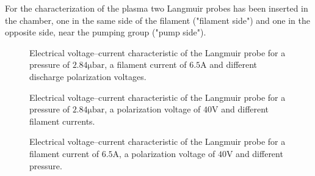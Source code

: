 \documentclass[11pt,a4 paper]{article}
\begin{document}
For the characterization of the plasma two Langmuir probes has been inserted in the chamber, one in the same side of the filament ("filament side") and one in the opposite side, near the pumping group ("pump side").
%
\begin{figure}[H]
\vspace{-0.3cm}%
 \vspace{-0.3cm}\caption{Electrical voltage--current characteristic of the Langmuir probe for a pressure of $2.84\si{\micro\bar}$, a filament current of $6.5\si{\ampere}$ and different discharge polarization voltages.}\label{fig:Lang}%
\end{figure}%
\vspace{-0.8cm}%
\begin{figure}[H]
  \vspace{-0.3cm}\caption{Electrical voltage--current characteristic of the Langmuir probe for a pressure of $2.84\si{\micro\bar}$, a polarization voltage of $40\si{\volt}$ and different filament currents.}\label{fig:Lang_c}%
\end{figure}%
\vspace{-0.8cm}%
\begin{figure}[H]
  \vspace{-0.3cm}\caption{Electrical voltage--current characteristic of the Langmuir probe for a filament current of $6.5\si{\ampere}$, a polarization voltage of $40\si{\volt}$ and different pressure.}\label{fig:Lang_p}%
\end{figure}
\end{document}
